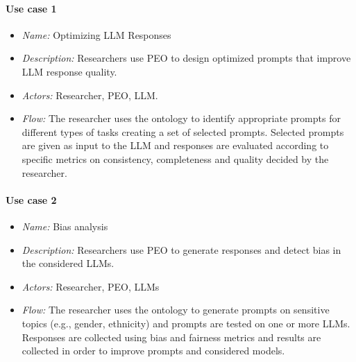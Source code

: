 \paragraph{Use case 1}
\begin{itemize}
    \item \textit{Name:} Optimizing LLM Responses
    \item \textit{Description:} Researchers use PEO to design optimized prompts that improve LLM response quality.
    \item \textit{Actors:} Researcher, PEO, LLM.
    \item \textit{Flow:} The researcher uses the ontology to identify appropriate prompts for different types of tasks creating a set of selected prompts. Selected prompts are given as input to the LLM and responses are evaluated according to specific metrics on consistency, completeness and quality decided by the researcher.
\end{itemize}
\paragraph{Use case 2}
\begin{itemize}
    \item \textit{Name:} Bias analysis
    \item \textit{Description:} Researchers use PEO to generate responses and detect bias in the considered LLMs.
    \item \textit{Actors:} Researcher, PEO, LLMs
    \item \textit{Flow:} The researcher uses the ontology to generate prompts on sensitive topics (e.g., gender, ethnicity) and prompts are tested on one or more LLMs. Responses are collected using bias and fairness metrics and results are collected in order to improve prompts and considered models. 
\end{itemize}

